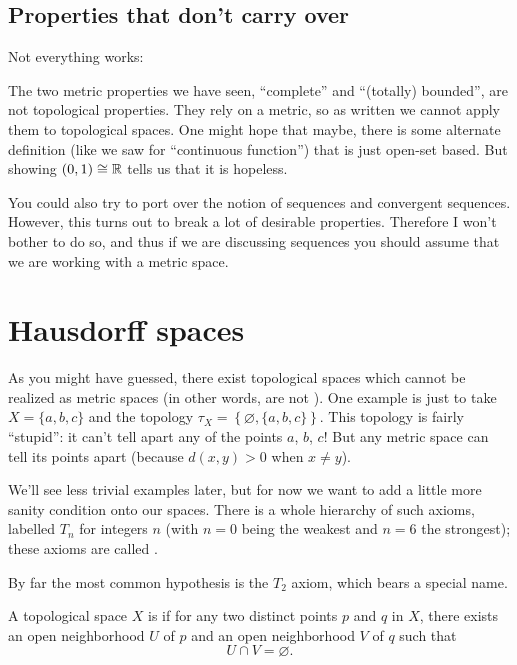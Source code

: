 \subsection{Properties that don't carry over}
Not everything works:

\begin{remark}
	The two metric properties we have seen,
	``complete'' and ``(totally) bounded'',
	are not topological properties.
	They rely on a metric,
	so as written we cannot apply them to topological spaces.
	One might hope that maybe,
	there is some alternate definition (like we saw for ``continuous function'')
	that is just open-set based.
	But  showing $(0,1) \cong \mathbb R$
	tells us that it is hopeless.
\end{remark}

\begin{remark}
	You could also try to port over the notion
	of sequences and convergent sequences.
	However, this turns out to break a lot of desirable properties.
	Therefore I won't bother to do so,
	and thus if we are discussing sequences you should
	assume that we are working with a metric space.
\end{remark}

\section{Hausdorff spaces}

As you might have guessed,
there exist topological spaces which cannot be realized
as metric spaces (in other words, are not ).
One example is just to take $X = \{a,b,c\}$ and the topology
$\tau_X = \left\{ \varnothing, \{a,b,c\} \right\}$.
This topology is fairly ``stupid'':
it can't tell apart any of the points $a$, $b$, $c$!
But any metric space can tell its points apart (because $d(x,y) > 0$ when $x \neq y$).

We'll see less trivial examples later,
but for now we want to add a little more sanity condition onto our spaces.
There is a whole hierarchy of such axioms, labelled $T_n$ for
integers $n$ (with $n=0$ being the weakest and $n=6$ the strongest);
these axioms are called .

By far the most common hypothesis is the $T_2$ axiom,
which bears a special name.
\begin{definition}
	A topological space $X$ is  if
	for any two distinct points $p$ and $q$ in $X$,
	there exists an open neighborhood $U$ of $p$
	and an open neighborhood $V$ of $q$ such that
	\[ U \cap V = \varnothing. \]
\end{definition}

